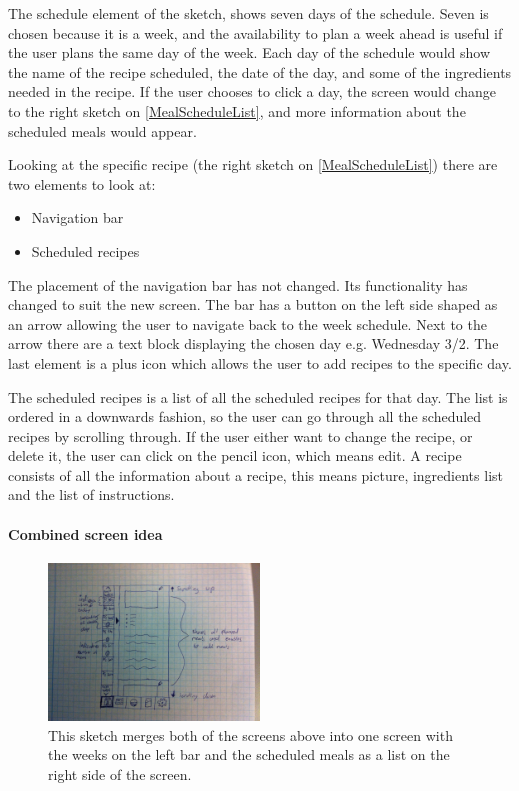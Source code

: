 The schedule element of the sketch, shows seven days of the schedule. Seven is chosen because it is a week, and the availability to plan a week ahead is useful if the user plans the same day of the week. Each day of the schedule would show the name of the recipe scheduled, the date of the day, and some of the ingredients needed in the recipe. If the user chooses to click a day, the screen would change to the right sketch on \cref{MealScheduleList}, and more information about the scheduled meals would appear.

Looking at the specific recipe (the right sketch on \cref{MealScheduleList}) there are two elements to look at:   

\begin{itemize}
    \item Navigation bar
    \item Scheduled recipes
\end{itemize}

The placement of the navigation bar has not changed. Its functionality has changed to suit the new screen. The bar has a button on the left side shaped as an arrow allowing the user to navigate back to the week schedule. Next to the arrow there are a text block displaying the chosen day e.g. Wednesday 3/2. The last element is a plus icon which allows the user to add recipes to the specific day.  



The scheduled recipes is a list of all the scheduled recipes for that day. The list is ordered in a downwards fashion, so the user can go through all the scheduled recipes by scrolling through. If the user either want to change the recipe, or delete it, the user can click on the pencil icon, which means edit. A recipe consists of all the information about a recipe, this means picture, ingredients list and the list of instructions.

\paragraph{Combined screen idea}

\begin{figure}[H]
	\centering
    \includegraphics[width=0.5\textwidth]{Grafik/FoodPlanner/FinalMealScheduleSketch2}
	\caption{This sketch merges both of the screens above into one screen with the weeks on the left bar and the scheduled meals as a list on the right side of the screen.}
	\label{MealScheduleBar}
\end{figure}

